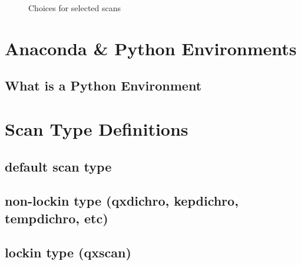 \documentclass[12pt,letterpaper, openany]{book}
\begin{document}
\begin{figure}[htp]

\centering
{}


\caption {Choices for selected scans}
\label{fig:selectionChoice}
\end{figure}

\begin{appendices}
\chapter{Anaconda \& Python Environments}
\section{What is a Python Environment}
\chapter{Scan Type Definitions}
\section{default scan type}
\section{non-lockin type (qxdichro, kepdichro, tempdichro,
etc)\label{non-lockin}}
\section{lockin type (qxscan)}

\end{appendices}

\printbibliography
\end{document}
